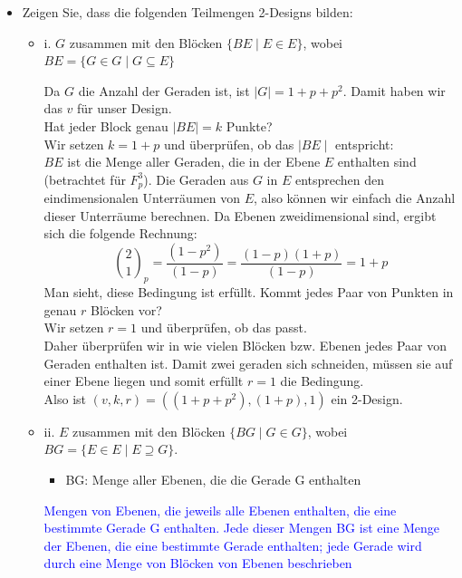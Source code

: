 \documentclass{article} %
\begin{document}
\begin{itemize}
    \item[(a)] Zeigen Sie, dass die folgenden Teilmengen 2-Designs bilden:
    \begin{itemize} 
        \item i. \( G \) zusammen mit den Blöcken \( \{BE \mid E \in E \} \), wobei \( BE = \{ G \in G \mid G \subseteq E \} \)
            \begin{mybox}
        Da $G$ die Anzahl der Geraden ist, ist $\mid G \mid = 1 + p + p^2 $. Damit haben wir das $v$ für unser Design. \\  \newline
        Hat jeder Block genau $\mid BE \mid = k$ Punkte? \\
        Wir setzen $k = 1 + p$ und überprüfen, ob das $\mid BE \mid$ entspricht: \\
        $BE$ ist die Menge aller Geraden, die in der Ebene $E$ enthalten sind (betrachtet für \( F_p^3 \)). 
        Die Geraden aus $G$ in $E$ entsprechen den eindimensionalen Unterräumen von $E$, also können wir einfach die Anzahl dieser Unterräume berechnen. Da Ebenen zweidimensional sind, ergibt sich die folgende Rechnung: 
            \[
\binom{2}{1}_p = \frac{ (1 - p^{2})}{(1 - p)} = \frac{ (1 - p)(1+p)}{(1 - p)} = 1 + p
\] 
Man sieht, diese Bedingung ist erfüllt. 
\newline
Kommt jedes Paar von Punkten in genau $r$ Blöcken vor? \\
Wir setzen $r = 1$ und überprüfen, ob das passt. \\ Daher überprüfen wir in wie vielen Blöcken bzw. Ebenen jedes Paar von Geraden enthalten ist. Damit zwei geraden sich schneiden, müssen sie auf einer Ebene liegen und somit erfüllt $r = 1$ die Bedingung.\\
        Also ist $(v,k,r)=((1 + p + p^2), (1+p), 1)$ ein 2-Design.
    \end{mybox}
        \item ii. \( E \) zusammen mit den Blöcken \( \{BG \mid G \in G \} \), wobei \( BG = \{ E \in E \mid E \supseteq G \} \).
        \begin{itemize}
            \item BG: Menge aller Ebenen, die die Gerade G enthalten
        \end{itemize}
        \textcolor{Blue}{Mengen von Ebenen, die jeweils alle Ebenen enthalten, die eine bestimmte Gerade G enthalten. Jede dieser Mengen BG ist eine Menge der Ebenen, die eine bestimmte Gerade enthalten; jede Gerade wird durch eine Menge von Blöcken von Ebenen beschrieben}

\end{itemize}
\end{itemize}
\end{document}
